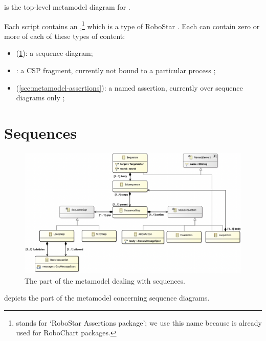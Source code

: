  is the top-level metamodel diagram for \langname.

Each \langname{} script contains an \mrapackage,\footnote{\mrapackage{} stands
for `RoboStar Assertions package'; we use this name because \mrcpackage{} is
already used for RoboChart packages.}
which is a type of RoboStar \mbasicpackage.
Each \mrapackage{} can contain zero or more of each of these types of content:

\begin{itemize}
\item
	\msequence{}
	(\cref{sec:metamodel-sequences}):
	a sequence diagram;
\item
	\mcspfragment:
	a CSP fragment, currently not bound to a particular process
	;
\item
	\mnamedassertion{}
	(\cref{sec:metamodel-assertions}):
	a named assertion, currently over sequence diagrams only
	;
\end{itemize}



\section{Sequences}\label{sec:metamodel-sequences}

\begin{figure}
	\centering
	\includegraphics[width=\textwidth]{diagrams/sequences.png}
	\caption{The part of the \langname{} metamodel dealing with sequences.}
	\label{fig:metamodel-sequences}
\end{figure}

 depicts the part of the metamodel concerning
sequence diagrams.

